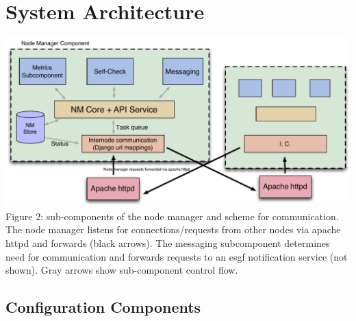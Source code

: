 \documentclass[oneside,12pt]{memoir}
\begin{document}
\section{System Architecture}



\begin{center}
\includegraphics[width=\textwidth]{presentation/NM-design-v2.pdf}
Figure 2:  sub-components of the node manager and scheme for communication.  The node manager listens for connections/requests from other nodes via apache httpd and forwards (black arrows).  The messaging subcomponent determines need for communication and forwards requests to an esgf notification service (not shown).  Gray arrows show sub-component control flow.
\end{center}
\newpage

\subsection{Configuration Components}
\label{stow}
\end{document}
